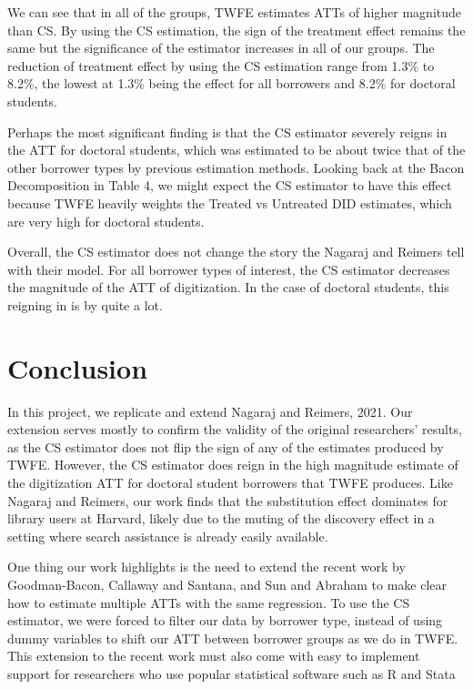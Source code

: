 \documentclass{article}
\begin{document}

 
We can see that in all of the groups, TWFE estimates ATTs of higher magnitude than CS. By using the CS estimation, the sign of the treatment effect remains the same but the significance of the estimator increases in all of our groups. The reduction of treatment effect by using the CS estimation range from 1.3\% to 8.2\%, the lowest at 1.3\% being the effect for all borrowers and 8.2\% for doctoral students.

Perhaps the most significant finding is that the CS estimator severely reigns in the ATT for doctoral students, which was estimated to be about twice that of the other borrower types by previous estimation methods. Looking back at the Bacon Decomposition in Table 4, we might expect the CS estimator to have this effect because TWFE heavily weights the Treated vs Untreated DID estimates, which are very high for doctoral students. 

Overall, the CS estimator does not change the story the Nagaraj and Reimers tell with their model. For all borrower types of interest, the CS estimator decreases the magnitude of the ATT of digitization. In the case of doctoral students, this reigning in is by quite a lot. 

\section{Conclusion}
In this project, we replicate and extend Nagaraj and Reimers, 2021. Our extension serves mostly to confirm the validity of the original researchers' results, as the CS estimator does not flip the sign of any of the estimates produced by TWFE.  However, the CS estimator does reign in the high magnitude estimate of the digitization ATT for doctoral student borrowers that TWFE produces. Like Nagaraj and Reimers, our work finds that the substitution effect dominates for library users at Harvard, likely due to the muting of the discovery effect in a setting where search assistance is already easily available. 

One thing our work highlights is the need to extend the recent work by Goodman-Bacon, Callaway and Santana, and Sun and Abraham to make clear how to estimate multiple ATTs with the same regression. To use the CS estimator, we were forced to filter our data by borrower type, instead of using dummy variables to shift our ATT between borrower groups as we do in TWFE. This extension to the recent work must also come with easy to implement support for researchers who use popular statistical software such as R and Stata
\end{document}
